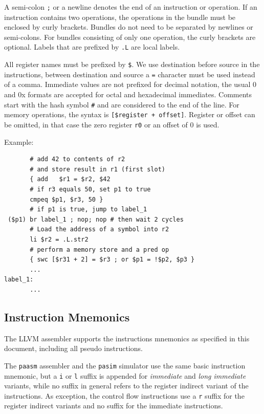 \documentclass[a4paper,fontsize=10pt,twoside,DIV15,BCOR12mm,headinclude=true,footinclude=false,pagesize,bibtotoc]{scrbook}
\newcommand{\comment}[3]{

\textsf{\textbf{#1}} {\color{#3}#2}}
\newcommand{\stefan}[1]{\comment{Stefan}{#1}{RoyalPurple}}
\renewcommand{\stefan}[1]{}
\begin{document}
A semi-colon \texttt{;} or a newline denotes the end of an instruction or operation. If an instruction contains two operations, the operations
in the bundle must be enclosed by curly brackets. Bundles do not need to be separated by newlines or semi-colons. For bundles consisting of
only one operation, the curly brackets are optional. Labels that are prefixed by \texttt{.L} are local labels.

All register names must be prefixed by \texttt{\$}.
We use destination before source in the instructions, between destination and source a \texttt{=} character must be used instead of a comma.
Immediate values are not prefixed for decimal notation, the usual 0 and 0x formats are accepted for octal and hexadecimal immediates.
Comments start with the hash symbol \texttt{\#} and are considered to the end of the line. For memory operations, the syntax is
\texttt{[\$register + offset]}. Register or offset can be omitted, in that case the zero register \texttt{r0} or an offset of $0$ is used.

Example:
\begin{verbatim}
       # add 42 to contents of r2
       # and store result in r1 (first slot)
       { add   $r1 = $r2, $42
       # if r3 equals 50, set p1 to true
       cmpeq $p1, $r3, 50 }
       # if p1 is true, jump to label_1
 ($p1) br label_1 ; nop; nop # then wait 2 cycles
       # Load the address of a symbol into r2
       li $r2 = .L.str2
       # perform a memory store and a pred op
       { swc [$r31 + 2] = $r3 ; or $p1 = !$p2, $p3 }
       ...
label_1:
       ...
\end{verbatim}

\stefan{TODO: some words about units of .align, .size, ..; describe .fstart;
I would like to move the assembly format description out into a public repo (patmos-misc) and merge
it with a compiler usage manual, ELF file format and backend description, though.}

\subsection{Instruction Mnemonics}

The LLVM assembler supports the instructions mnemonics as specified in this document, including all pseudo instructions.

The \texttt{paasm} assembler and the \texttt{pasim} simulator use the same basic instruction mnemonic, but a \texttt{i} or
\texttt{l} suffix is appended for \emph{immediate} and \emph{long immediate} variants, while no suffix in general refers to
the register indirect variant of the instructions. As exception, the control flow instructions use a \texttt{r} suffix for the register
indirect variants and no suffix for the immediate instructions.
\stefan{This should be cleaned up, always use \texttt{i} suffix for immediates in pasim/paasm, including control flow.}
\end{document}
